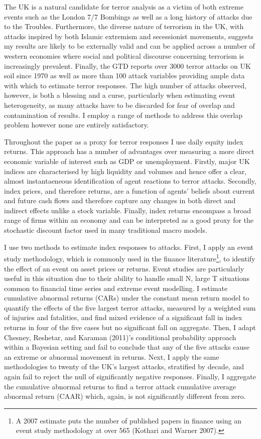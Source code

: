 \documentclass[]{AEA}
\begin{document}
The UK is a natural candidate for terror analysis as a victim of both
extreme events such as the London 7/7 Bombings as well as a long history
of attacks due to the Troubles. Furthermore, the diverse nature of
terrorism in the UK, with attacks inspired by both Islamic extremism and
secessionist movements, suggests my results are likely to be externally
valid and can be applied across a number of western economies where
social and political discourse concerning terrorism is increasingly
prevalent. Finally, the GTD reports over 3000 terror attacks on UK soil
since 1970 as well as more than 100 attack variables providing ample
data with which to estimate terror responses. The high number of attacks
observed, however, is both a blessing and a curse, particularly when
estimating event heterogeneity, as many attacks have to be discarded for
fear of overlap and contamination of results. I employ a range of
methods to address this overlap problem however none are entirely
satisfactory.

Throughout the paper as a proxy for terror responses I use daily equity
index returns. This approach has a number of advantages over measuring a
more direct economic variable of interest such as GDP or unemployment.
Firstly, major UK indices are characterised by high liquidity and
volumes and hence offer a clear, almost instantaeneous identification of
agent reactions to terror attacks. Secondly, index prices, and therefore
returns, are a function of agents' beliefs about current and future cash
flows and therefore capture any changes in both direct and indirect
effects unlike a stock variable. Finally, index returns encompass a
broad range of firms within an economy and can be interpreted as a good
proxy for the stochastic discount factor used in many traditional macro
models.

I use two methods to estimate index responses to attacks. First, I apply
an event study methodology, which is commonly used in the finance
literature\footnote{A 2007 estimate puts the number of published papers
  in finance using an event study methodology at over 565 (Kothari and
  Warner 2007).}, to identify the effect of an event on asset prices or
returns. Event studies are particularly useful in this situation due to
their ability to handle small N, large T situations common to financial
time series and extreme event modelling. I estimate cumulative abnormal
returns (CARs) under the constant mean return model to quantify the
effects of the five largest terror attacks, measured by a weighted sum
of injuries and fatalities, and find mixed evidence of a significant
fall in index returns in four of the five cases but no significant fall
on aggregate. Then, I adapt Chesney, Reshetar, and Karaman (2011)'s
conditional probability approach within a Bayesian setting and fail to
conclude that any of the five attacks cause an extreme or abnormal
movement in returns. Next, I apply the same methodologies to twenty of
the UK's largest attacks, stratified by decade, and again fail to reject
the null of significantly negative responses. Finally, I aggregate the
cumulative abnormal returns to find a terror attack cumulative average
abnormal return (CAAR) which, again, is not significantly different from
zero.
\end{document}
